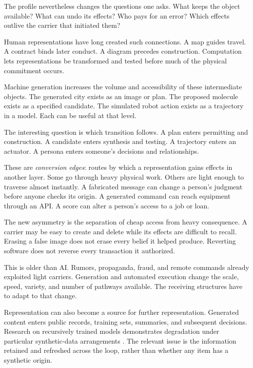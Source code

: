 The profile nevertheless changes the questions one asks. What keeps the object available? What can undo its effects? Who pays for an error? Which effects outlive the carrier that initiated them?

Human representations have long created such connections. A map guides travel. A contract binds later conduct. A diagram precedes construction. Computation lets representations be transformed and tested before much of the physical commitment occurs.

Machine generation increases the volume and accessibility of these intermediate objects. The generated city exists as an image or plan. The proposed molecule exists as a specified candidate. The simulated robot action exists as a trajectory in a model. Each can be useful at that level.

The interesting question is which transition follows. A plan enters permitting and construction. A candidate enters synthesis and testing. A trajectory enters an actuator. A persona enters someone's decisions and relationships.

These are \emph{conversion edges}: routes by which a representation gains effects in another layer. Some go through heavy physical work. Others are light enough to traverse almost instantly. A fabricated message can change a person's judgment before anyone checks its origin. A generated command can reach equipment through an API. A score can alter a person's access to a job or loan.

The new asymmetry is the separation of cheap access from heavy consequence. A carrier may be easy to create and delete while its effects are difficult to recall. Erasing a false image does not erase every belief it helped produce. Reverting software does not reverse every transaction it authorized.

This is older than AI. Rumors, propaganda, fraud, and remote commands already exploited light carriers. Generation and automated execution change the scale, speed, variety, and number of pathways available. The receiving structures have to adapt to that change.

Representation can also become a source for further representation. Generated content enters public records, training sets, summaries, and subsequent decisions. Research on recursively trained models demonstrates degradation under particular synthetic-data arrangements \cite{shumailov2024ai}. The relevant issue is the information retained and refreshed across the loop, rather than whether any item has a synthetic origin.

